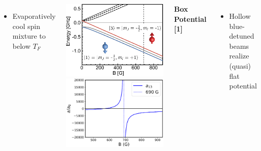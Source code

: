 \documentclass[26pt, paperwidth=36in,paperheight=48in]{tikzposter} %
\newcommand{\myfont}{\fontsize{24}{30}\selectfont}
\begin{document}
\begin{columns}
{\begin{minipage}{0.17\textwidth}
\begin{itemize}
		\item Evaporatively cool spin mixture to below $T_F$
	\end{itemize}
\vspace{2cm}
\end{minipage}
\hspace{0.25cm}
\begin{minipage}{0.15\textwidth}
	\centering
	\includegraphics[width=1.1\textwidth]{figures/BreitRabiLi6.pdf}
	\centering
	\includegraphics[width=1.1\textwidth]{figures/Feshbach_Plot.eps}
\end{minipage}



\vspace{0.5cm}
\begin{minipage}{0.14\textwidth}
	\flushleft
	\textbf{Box Potential [1]}
	\vspace{1cm}
	\myfont
	\begin{itemize}
		\item Hollow blue-detuned beams realize (quasi) flat potential
		

\end{itemize}
\end{minipage}}
\end{columns}
\end{document}
